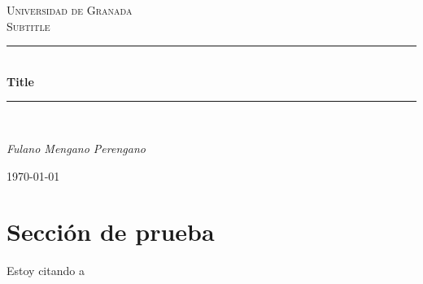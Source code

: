 \documentclass[a4paper,11pt]{article}
\begin{document}
  \begin{titlepage}

  \newcommand{\HRule}{\rule{\linewidth}{0.5mm}} %

  \center %
  
  \textsc{\LARGE Universidad de Granada}\\[1.5cm]
  \textsc{\Large Subtitle}\\[0.5cm] 

  \bigskip
  \HRule \\[0.4cm]
  { \huge \bfseries Title}\\[0.4cm] %
  \HRule \\[1.5cm]
  

  \begin{minipage}{0.4\textwidth}
  \begin{center} \large
  \emph{Fulano Mengano Perengano}\\
  \end{center}
  \end{minipage}


  \begin{center}
  \end{center}

  \vspace{\fill}%
  \large\today
  \end{titlepage}  

  \newpage
  \tableofcontents
  \newpage
    \section{Sección de prueba}
      Estoy citando a \cite{prueba}
  \printbibliography
\end{document}
